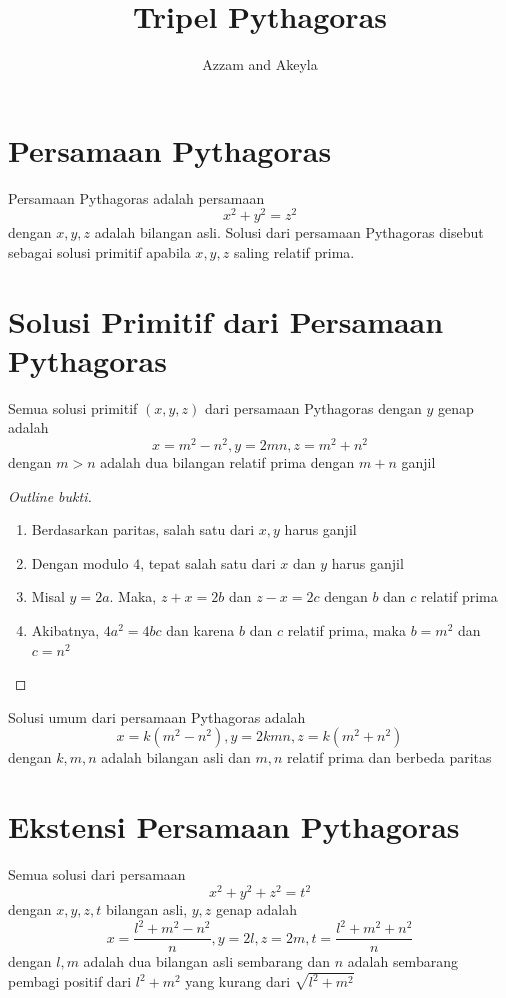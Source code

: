 \documentclass[11pt]{scrartcl}
\title{Tripel Pythagoras}
\author{Azzam and Akeyla}
\begin{document}
\maketitle

\renewcommand*\contentsname{Daftar Isi}
\tableofcontents

\newpage

\section{Persamaan Pythagoras}
Persamaan Pythagoras adalah persamaan \[x^2 + y^2 = z^2\] dengan $x, y, z$ adalah bilangan asli.
Solusi dari persamaan Pythagoras disebut sebagai solusi primitif apabila $x, y, z$ saling relatif prima.

\section{Solusi Primitif dari Persamaan Pythagoras}
\begin{theorem}
    Semua solusi primitif $(x, y, z)$ dari persamaan Pythagoras dengan $y$ genap adalah \[x = m^2 - n^2, y = 2mn, z = m^2 + n^2\] dengan $m > n$ adalah dua bilangan relatif prima dengan $m + n$ ganjil
\end{theorem}
\begin{proof}[Outline bukti]
    \begin{enumerate}
        \item Berdasarkan paritas, salah satu dari $x, y$ harus ganjil
        \item Dengan modulo $4$, tepat salah satu dari $x$ dan $y$ harus ganjil
        \item Misal $y = 2a$. Maka, $z + x = 2b$ dan $z - x = 2c$ dengan $b$ dan $c$ relatif prima
        \item Akibatnya, $4a^2 = 4bc$ dan karena $b$ dan $c$ relatif prima, maka $b = m^2$ dan $c = n^2$
    \end{enumerate}
\end{proof}

\begin{corollary}[Akibat]
    Solusi umum dari persamaan Pythagoras adalah \[x = k(m^2 - n^2), y = 2kmn, z = k(m^2 + n^2)\] dengan $k, m, n$ adalah bilangan asli dan $m, n$ relatif prima dan berbeda paritas
\end{corollary}

\section{Ekstensi Persamaan Pythagoras}
\begin{theorem}
    Semua solusi dari persamaan \[x^2 + y^2 + z^2 = t^2\] dengan $x, y, z, t$ bilangan asli, $y, z$ genap adalah \[x = \dfrac{l^2 + m^2 - n^2}{n}, y = 2l, z = 2m, t = \dfrac{l^2 + m^2 + n^2}{n}\] dengan $l, m$ adalah dua bilangan asli sembarang dan $n$ adalah sembarang pembagi positif dari $l^2 + m^2$ yang kurang dari $\sqrt{l^2 + m^2}$
\end{theorem}
\end{document}
